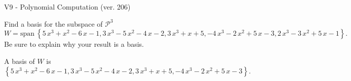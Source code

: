 \begin{exercise}
  \begin{exerciseTitle}V9 - Polynomial Computation (ver. 206)\end{exerciseTitle}
  \begin{exerciseStatement}
    Find a basis for the subspace of \(\mathcal{P}^3\) 
\[W=\mathrm{span}\ \left\{5 \, x^{3} + x^{2} - 6 \, x - 1 , 3 \, x^{3} - 5 \, x^{2} - 4 \, x - 2 , 3 \, x^{3} + x + 5 , -4 \, x^{3} - 2 \, x^{2} + 5 \, x - 3 , 2 \, x^{3} - 3 \, x^{2} + 5 \, x - 1\right\}.\]
 Be sure to explain why your result is a basis.


  \end{exerciseStatement}
  \begin{exerciseAnswer}
   A basis of \(W\) is  \(\left\{5 \, x^{3} + x^{2} - 6 \, x - 1 , 3 \, x^{3} - 5 \, x^{2} - 4 \, x - 2 , 3 \, x^{3} + x + 5 , -4 \, x^{3} - 2 \, x^{2} + 5 \, x - 3\right\}\).
  


  \end{exerciseAnswer}
\end{exercise}